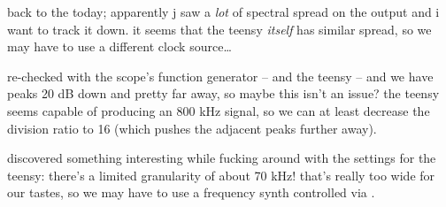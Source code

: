 back to the \pll today; apparently j saw a \emph{lot} of spectral spread on the
output and i want to track it down. it seems that the teensy \emph{itself} has
similar spread, so we may have to use a different clock source\dots

re-checked with the scope's function generator -- and the teensy -- and we have
peaks 20 dB down and pretty far away, so maybe this isn't an issue? the teensy
seems capable of producing an 800 kHz signal, so we can at least decrease the
division ratio to 16 (which pushes the adjacent peaks further away).

discovered something interesting while fucking around with the \pll settings
for the teensy: there's a limited granularity of about 70 kHz! that's really
too wide for our tastes, so we may have to use a frequency synth controlled via
\spi.
